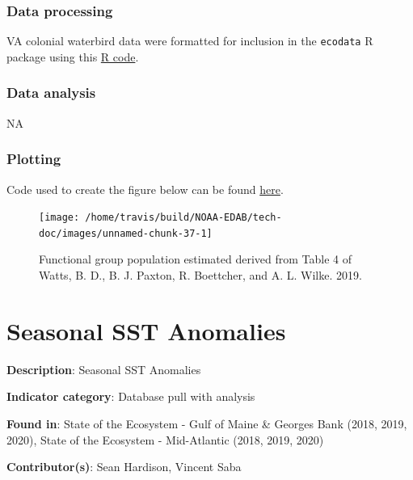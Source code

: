\documentclass[
]{book}
\begin{document}
\hypertarget{data-processing-24}{%
\subsection{Data processing}\label{data-processing-24}}

VA colonial waterbird data were formatted for inclusion in the \texttt{ecodata} R package using this \href{https://github.com/NOAA-EDAB/ecodata/blob/master/data-raw/get_seabird_MAB.R}{R code}.

\hypertarget{data-analysis-31}{%
\subsection{Data analysis}\label{data-analysis-31}}

NA

\hypertarget{plotting-26}{%
\subsection{Plotting}\label{plotting-26}}

Code used to create the figure below can be found \href{https://github.com/NOAA-EDAB/ecodata/blob/master/chunk-scripts/macrofauna.Rmd-VA-cote.R}{here}.

\begin{figure}

{\centering \texttt{[image: /home/travis/build/NOAA-EDAB/tech-doc/images/unnamed-chunk-37-1]} 

}

\caption{Functional group population estimated derived from Table 4 of Watts, B. D., B. J. Paxton, R. Boettcher, and A. L. Wilke. 2019.}\label{fig:unnamed-chunk-37}
\end{figure}

\hypertarget{seasonal-sst-anomalies}{%
\chapter{Seasonal SST Anomalies}\label{seasonal-sst-anomalies}}

\textbf{Description}: Seasonal SST Anomalies

\textbf{Indicator category}: Database pull with analysis

\textbf{Found in}: State of the Ecosystem - Gulf of Maine \& Georges Bank (2018, 2019, 2020), State of the Ecosystem - Mid-Atlantic (2018, 2019, 2020)

\textbf{Contributor(s)}: Sean Hardison, Vincent Saba
\end{document}

